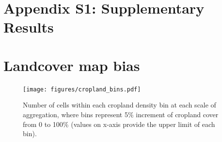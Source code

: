 \documentclass[12pt]{iopart}
\begin{document}


\setpagewiselinenumbers
\section*{\large Appendix S1: Supplementary Results}
\section*{Landcover map bias}



\begin{figure}[ht]
  \centering
     \texttt{[image: figures/cropland\_bins.pdf]} 
      \caption{Number of cells within each cropland density bin at each scale of aggregation, where bins represent 5\% increment of cropland cover from 0 to 100\% (values on x-axis provide the upper limit of each bin).}
      \label{fig:default}
\end{figure}



\end{document}
